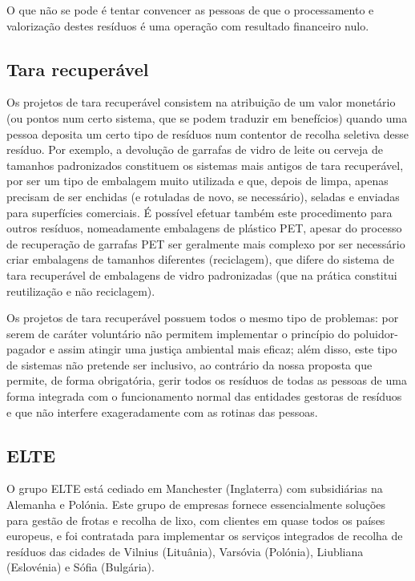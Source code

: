 \documentclass[11pt, a4paper, oneside]{book}
\begin{document}
O que não se pode é tentar convencer as pessoas de que o processamento e valorização destes resíduos é uma operação com resultado financeiro nulo.

\subsection{Tara recuperável}

Os projetos de tara recuperável consistem na atribuição de um valor monetário (ou pontos num certo sistema, que se podem traduzir em benefícios) quando uma pessoa deposita um certo tipo de resíduos num contentor de recolha seletiva desse resíduo. Por exemplo, a devolução de garrafas de vidro de leite ou cerveja de tamanhos padronizados constituem os sistemas mais antigos de tara recuperável, por ser um tipo de embalagem muito utilizada e que, depois de limpa, apenas precisam de ser enchidas (e rotuladas de novo, se necessário), seladas e enviadas para superfícies comerciais. É possível efetuar também este procedimento para outros resíduos, nomeadamente embalagens de plástico PET, apesar do processo de recuperação de garrafas PET ser geralmente mais complexo por ser necessário criar embalagens de tamanhos diferentes (reciclagem), que difere do sistema de tara recuperável de embalagens de vidro padronizadas (que na prática constitui reutilização e não reciclagem).

Os projetos de tara recuperável possuem todos o mesmo tipo de problemas: por serem de caráter voluntário não permitem implementar o princípio do poluidor-pagador e assim atingir uma justiça ambiental mais eficaz; além disso, este tipo de sistemas não pretende ser inclusivo, ao contrário da nossa proposta que permite, de forma obrigatória, gerir todos os resíduos de todas as pessoas de uma forma integrada com o funcionamento normal das entidades gestoras de resíduos e que não interfere exageradamente com as rotinas das pessoas.

\subsection{ELTE}

O grupo ELTE está cediado em Manchester (Inglaterra) com subsidiárias na Alemanha e Polónia. Este grupo de empresas fornece essencialmente soluções para gestão de frotas e recolha de lixo, com clientes em quase todos os países europeus, e foi contratada para implementar os serviços integrados de recolha de resíduos das cidades de Vilnius (Lituânia), Varsóvia (Polónia), Liubliana (Eslovénia) e Sófia (Bulgária).
\end{document}
